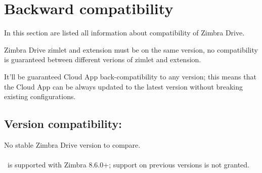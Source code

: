 \section{Backward compatibility}
In this section are listed all information about compatibility of Zimbra Drive.

Zimbra Drive zimlet and extension must be on the same version,
no compatibility is guaranteed between different verions of zimlet and extension.

It'll be guaranteed Cloud App back-compatibility to any version; this means that the Cloud App can be always updated
to the latest version without breaking existing configurations.

\subsection{Version compatibility: \version\ }
No stable Zimbra Drive version to compare.\\\\
\version\ is supported with Zimbra 8.6.0+; support on previous versions is not granted.